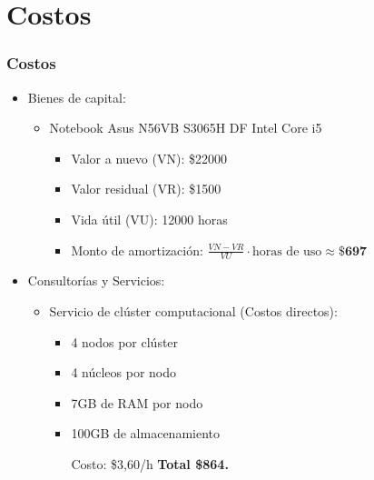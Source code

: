 \section{Costos}
\begin{frame}[t,fragile]
	\frametitle {Costos}
		\begin{itemize}
			\item Bienes de capital:
			\begin{itemize}
				\item Notebook Asus N56VB S3065H DF Intel Core i5
				\begin{itemize}
					\item Valor a nuevo (VN): \$22000
					\item Valor residual (VR): \$1500
					\item Vida \'util (VU): 12000 horas
					\item Monto de amortizaci\'on:
					 $\frac{VN-VR}{VU} \cdot \text{horas de uso}\approx \textbf{\$697}$
				\end{itemize}
			\end{itemize}
			\pause
			\item Consultor\'ias y Servicios:
			\begin{itemize}
				\item Servicio de cl\'uster computacional (Costos directos):
				\begin{itemize}
					 
					\item 4 nodos por cl\'uster
					\item 4 n\'ucleos por nodo
					\item 7GB de RAM por nodo
					\item 100GB de almacenamiento
					
					Costo: \$3,60/h    
					\textbf{Total \$864.}
				\end{itemize}
			\end{itemize}
		\end{itemize}
\end{frame}
